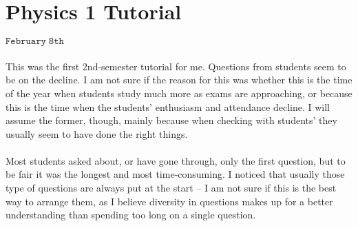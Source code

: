 \section{Physics 1 Tutorial}
\begin{flushright}
$\mathtt{February \; 8th}$
\end{flushright}
\paragraph{}

This was the first 2nd-semester tutorial for me. Questions from students seem to be on the decline. I am not sure if the reason for this was whether this is the time of the year when students study much more as exams are approaching, or because this is the time when the students' enthusiasm and attendance decline. I will assume the former, though, mainly because when checking with students' they usually seem to have done the right things.
\paragraph{}

Most students asked about, or have gone through, only the first question, but to be fair it was the longest and most time-consuming. I noticed that usually those type of questions are always put at the start -- I am not sure if this is the best way to arrange them, as I believe diversity in questions makes up for a better understanding than spending too long on a single question.